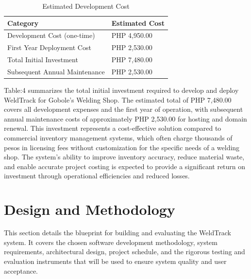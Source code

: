 \documentclass[12pt, letterpaper]{article}
\begin{document}
\begin{table}[h]
\centering
\caption{Estimated Development Cost}
\begin{tabular}{p{6cm} p{3cm}}
\toprule
\textbf{Category} & \textbf{Estimated Cost} \\
\midrule
Development Cost (one-time) & PHP 4,950.00 \\
First Year Deployment Cost & PHP 2,530.00 \\
Total Initial Investment  & PHP 7,480.00\\
Subsequent Annual Maintenance & PHP 2,530.00 \\
\bottomrule
\end{tabular}
\end{table}
\hspace* {2em}Table:4 summarizes the total initial investment required to develop and deploy WeldTrack for Gobole's Welding Shop. The estimated total of PHP 7,480.00 covers all development expenses and the first year of operation, with subsequent annual maintenance costs of approximately PHP 2,530.00 for hosting and domain renewal. This investment represents a cost-effective solution compared to commercial inventory management systems, which often charge thousands of pesos in licensing fees without customization for the specific needs of a welding shop. The system's ability to improve inventory accuracy, reduce material waste, and enable accurate project costing is expected to provide a significant return on investment through operational efficiencies and reduced losses.





\section{Design and Methodology}
\hspace*{2em} This section details the blueprint for building and evaluating the WeldTrack system. It covers the chosen software development methodology, system requirements, architectural design, project schedule, and the rigorous testing and evaluation instruments that will be used to ensure system quality and user acceptance.
\end{document}
